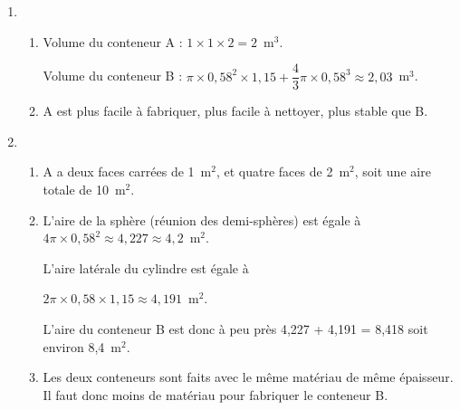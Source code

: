 \begin{enumerate}
\item 
	\begin{enumerate}
		\item %
Volume du conteneur A : $1 \times 1 \times 2 = 2$~m$^3$.
		
Volume du conteneur B : $\pi \times 0,58^2 \times 1,15 + \dfrac{4}{3}\pi \times 0,58^3 \approx 2,03$~m$^3$.
		\item %
A est plus facile à fabriquer, plus facile à nettoyer, plus stable que B.
	\end{enumerate} 
\item %
	\begin{enumerate}
		\item %
A a deux faces carrées de 1~m$^2$, et quatre  faces   de 2~m$^2$, soit une aire totale de 10~m$^2$.
		\item %
L’aire de la sphère (réunion des demi-sphères) est égale à $4 \pi \times 0,58^2 \approx 4,227 \approx 4,2$~m$^2$.

L’aire latérale du cylindre est égale à 

$2 \pi \times 0,58 \times 1,15 \approx 4,191$~m$^2$.

L’aire du conteneur B est donc à peu près 4,227 + 4,191 = 8,418 soit environ 8,4~m$^2$. 
		\item %
Les deux conteneurs sont faits avec le même matériau de même épaisseur. Il faut donc moins de matériau pour fabriquer le conteneur B.
	\end{enumerate}
\end{enumerate}

% 
%
%
%

\bigskip

